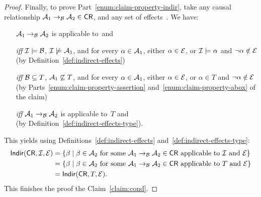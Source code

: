 \begin{proof}
    Finally, to prove Part~\ref{enum:claim-property-indir}, take any causal
    relationship $\mathcal{A}_1\to_{\mathcal{B}}\mathcal{A}_2\in\mathsf{CR}$, and any set of
    effects~\Emc.  We have:
    \begin{itemize}
        \item[]
            $\mathcal{A}_1\to_{\mathcal{B}}\mathcal{A}_2$ is applicable to~\Imc and~\Emc
        \item[\emph{iff}]
            $\mathcal{I}\models\mathcal{B}$, $\mathcal{I}\not\models\mathcal{A}_1$, and
            for every $\alpha\in\mathcal{A}_1$, either $\alpha\in\mathcal{E}$, or
            $\mathcal{I}\models\alpha$ and $\lnot\alpha\notin\mathcal{E}$\\
            (by Definition~\ref{def:indirect-effects})
        \item[\emph{iff}]
            $\mathcal{B}\subseteq T$, $\mathcal{A}_1\not\subseteq T$, and
            for every $\alpha\in\mathcal{A}_1$, either $\alpha\in\mathcal{E}$, or
            $\alpha\in T$ and $\lnot\alpha\notin\mathcal{E}$\\
            (by Parts~\ref{enum:claim-property-assertion}
            and~\ref{enum:claim-property-abox} of the claim)
        \item[\emph{iff}]
            $\mathcal{A}_1\to_{\mathcal{B}}\mathcal{A}_2$ is applicable to~$T$ and~\Emc\\
            (by Definition~\ref{def:indirect-effects-type}).
    \end{itemize}
    This yields using Definitions~\ref{def:indirect-effects}
    and~\ref{def:indirect-effects-type}:
    \begin{align*}
        \Indir(\CR,\Imc,\Emc)
        &=\{\beta\mid\beta\in\Amc_2\ \text{for some}\ \causes{\Amc_1}{\Amc_2}{\Bmc}\in\CR\ \text{applicable to~\Imc and~\Emc}\}\\
        &=\{\beta\mid\beta\in\Amc_2\ \text{for some}\ \causes{\Amc_1}{\Amc_2}{\Bmc}\in\CR\ \text{applicable to~$T$ and~\Emc}\}\\
        &=\Indir(\CR,T,\Emc).
    \end{align*}
    This finishes the proof the Claim~\ref{claim:cond}.


\end{proof}
